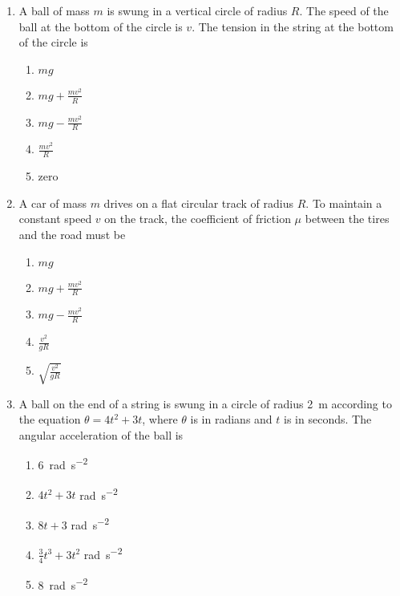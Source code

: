 \documentclass{../../../oss-apphys}
\begin{document}
\begin{multicols}{2}
\begin{enumerate}[leftmargin=18pt]
  \item A ball of mass $m$ is swung in a vertical circle of radius $R$. The
    speed of the ball at the bottom of the circle is $v$. The tension in the
    string at the bottom of the circle is
    \begin{enumerate}[noitemsep,topsep=0pt,leftmargin=18pt,label=(\Alph*)]
    \item $\displaystyle mg$
    \item $\displaystyle mg+\frac{mv^2}{R}$
    \item $\displaystyle mg-\frac{mv^2}{R}$
    \item $\displaystyle \frac{mv^2}{R}$
    \item zero
    \end{enumerate}
    
  \item A car of mass $m$ drives on a flat circular track of radius $R$. To
    maintain a constant speed $v$ on the track, the coefficient of friction
    $\mu$ between the tires and the road must be
    \begin{enumerate}[noitemsep,topsep=0pt,leftmargin=18pt,label=(\Alph*)]
    \item $\displaystyle mg$
    \item $\displaystyle mg+\frac{mv^2}{R}$
    \item $\displaystyle mg-\frac{mv^2}{R}$
    \item $\displaystyle \frac{v^2}{gR}$
    \item $\displaystyle \sqrt{\frac{v^2}{gR}}$
    \end{enumerate}
    
  \item A ball on the end of a string is swung in a circle of radius
    \SI{2}{\metre} according to the equation $\theta = 4t^2+3t$, where $\theta$
    is in radians and $t$ is in seconds. The angular acceleration of the ball
    is
    \begin{enumerate}[noitemsep,topsep=0pt,leftmargin=18pt,label=(\Alph*)]
    \item\SI{6}{rad\per\second^2}
    \item $4t^2 + 3t$ \si{rad\per\second^2}
    \item $8t +3$ \si{rad\per\second^2}
    \item $\displaystyle\frac{3}{4} t^3 + 3t^2$ \si{rad\per\second^2}
    \item \SI{8}{rad\per\second^2}
    \end{enumerate}
    \columnbreak
    

\end{enumerate}
\end{multicols}
\end{document}
